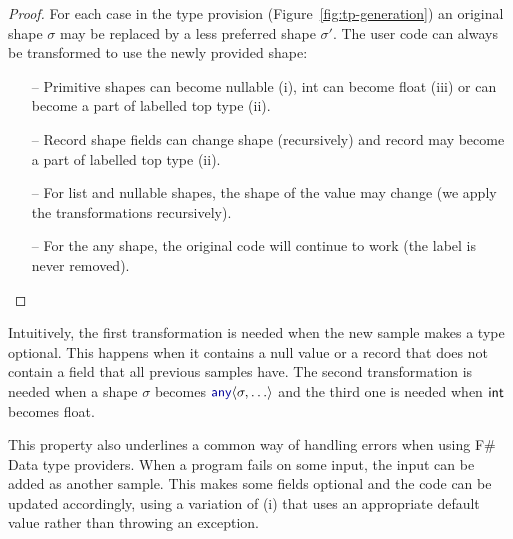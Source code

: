 \documentclass[10pt]{sigplanconf}
\newcommand{\kvd}[1]{\textnormal{\textcolor{kvdclr}{\sffamily #1}}}
\newcommand{\ident}[1]{\textnormal{\sffamily #1}}
\begin{document}
\begin{proof}
For each case in the type provision (Figure~\ref{fig:tp-generation}) an original shape $\sigma$
may be replaced by a less preferred shape $\sigma'$. The user code can always be transformed
to use the newly provided shape:

\begin{itemize}
\item[--] Primitive shapes can become nullable (i), \ident{int} can become \ident{float} (iii)
  or can become a part of labelled top type (ii).
\item[--] Record shape fields can change shape (recursively) and record may become a part
  of labelled top type (ii).
\item[--] For list and nullable shapes, the shape of the value may change (we apply the 
  transformations recursively).
\item[--] For the any shape, the original code will continue to work (the label is never removed).
\end{itemize}
\vspace{-1.5em}
\end{proof}
%
\noindent
Intuitively, the first transformation is needed when the new sample makes a type optional.
This happens when it contains a \kvd{null} value or a record that does not contain a field 
that all previous samples have. The second transformation is needed when a shape $\sigma$ 
becomes $\kvd{any}\langle\sigma, \ldots\rangle$ and the third one is needed when $\ident{int}$
becomes \ident{float}.

This property also underlines a common way of handling errors when using F\# Data type providers.
When a program fails on some input, the input can be added as another sample. This makes some
fields optional and the code can be updated accordingly, using a variation of (i) that uses
an appropriate default value rather than throwing an exception.



%
%
\end{document}
